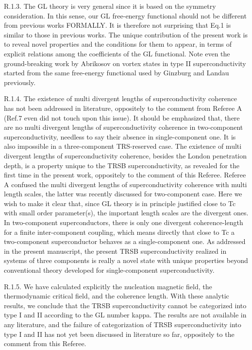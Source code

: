 \documentclass[11pt]{article}
\begin{document}
R.1.3. The GL theory is very general since it is based on the symmetry
consideration. In this sense, our GL free-energy functional should not
be different from previous works FORMALLY. It is therefore not
surprising that Eq.1 is similar to those in previous works. The unique
contribution of the present work is to reveal novel properties and the
conditions for them to appear, in terms of explicit relations among the
coefficients of the GL functional. Note even the ground-breaking work by
Abrikosov on vortex states in type II superconductivity started from the
same free-energy functional used by Ginzburg and Landau previously.

R.1.4. The existence of multi divergent lengths of superconductivity
coherence has not been addressed in literature, oppositely to the
comment from Referee A (Ref.7 even did not touch upon this issue). It
should be emphasized that, there are no multi divergent lengths of
superconductivity coherence in two-component superconductivity, needless
to say their absence in single-component one. It is also impossible in a
three-component TRS-reserved case. The existence of multi divergent
lengths of superconductivity coherence, besides the London penetration
depth, is a property unique to the TRSB superconductivity, as revealed
for the first time in the present work, oppositely to the comment of
this Referee. Referee A confused the multi divergent lengths of
superconductivity coherence with multi length scales, the latter was
recently discussed for two-component case. Here we wish to make it clear
that, since GL theory is in principle justified close to Tc with small
order parameter(s), the important length scales are the divergent ones.
In two-component superconductors, there is only one divergent
coherence-length for a finite inter-component coupling, which means
directly that close to Tc a two-component superconductor behaves as a
single-component one. As addressed in the present manuscript, the
present TRSB superconductivity realized in systems of three components
is really a novel state with unique properties beyond conventional
theory developed for single-component superconductivity.

R.1.5. We have calculated explicitly the nucleation magnetic field, the
thermodynamic critical field, and the coherence length. With these
analytic results, we conclude that the TRSB superconductivity cannot be
categorized into type I and II according to the GL number kappa. The
results are not available in any literature, and the failure of
categorization of TRSB superconductivity into type I and II has not yet
been discussed in literature so far, oppositely to the comment from this
Referee.
\end{document}
